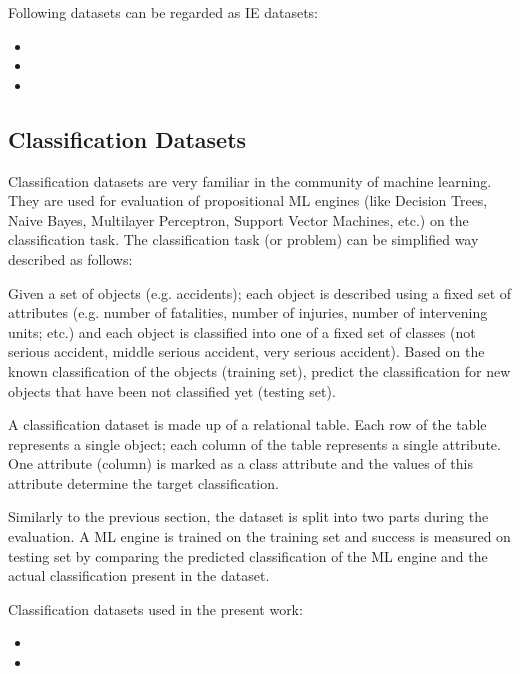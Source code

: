 Following datasets can be regarded as IE datasets:

\begin{itemize}
	\item {}
	\item {}
	\item {}
\end{itemize}


\subsection{Classification Datasets}
Classification datasets are very familiar in the community of machine learning. They are used for evaluation of propositional ML engines (like Decision Trees, Naive Bayes, Multilayer Perceptron, Support Vector Machines, etc.) on the classification task. The classification task (or problem) can be simplified way described as follows: 

Given a set of objects (e.g. accidents); each object is described using a fixed set of attributes (e.g. number of fatalities, number of injuries, number of intervening units; etc.) and each object is classified into one of a fixed set of classes (not serious accident, middle serious accident, very serious accident). Based on the known classification of the objects (training set), predict the classification for new objects that have been not classified yet (testing set). 

A classification dataset is made up of a relational table. Each row of the table represents a single object; each column of the table represents a single attribute. One attribute (column) is marked as a class attribute and the values of this attribute determine the target classification. 

Similarly to the previous section, the dataset is split into two parts during the evaluation. A ML engine is trained on the training set and success is measured on testing set by comparing the predicted classification of the ML engine and the actual classification present in the dataset.

Classification datasets used in the present work:
\begin{itemize}
	\item {}
	\item {}
\end{itemize}

